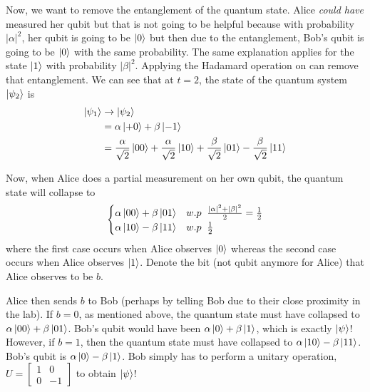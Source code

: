 Now, we want to remove the entanglement of the quantum state. Alice \textit{could have} measured her qubit but that is not going to be helpful because with probability \(|\alpha|^2\), her qubit is going to be \(\ket{0}\) but then due to the entanglement, Bob's qubit is going to be \(\ket{0}\) with the same probability. The same explanation applies for the state \(\ket{1}\) with probability \(|\beta|^2\). Applying the Hadamard operation on  can remove that entanglement. We can see that at \(t = 2\), the state of the quantum system \(\ket{\psi_2}\) is \begin{equation}
    \begin{aligned}
        \ket{\psi_1} &\rightarrow \ket{\psi_2}\\
        &= \alpha \ket{+0} + \beta \ket{-1}\\
        &= \frac{\alpha}{\sqrt{2}}\ket{00} + \frac{\alpha}{\sqrt{2}}
        \ket{10} + \frac{\beta}{\sqrt{2}}\ket{01} - \frac{\beta}{\sqrt{2}}
        \ket{11}
    \end{aligned}
\end{equation}

Now, when Alice does a partial measurement on her own qubit, the quantum state will collapse to \begin{equation}
    \begin{cases}
    \alpha \ket{00} + \beta \ket{01} &w.p \;\;\frac{|\alpha|^2 + |\beta|^2}{2} = \frac{1}{2}\\
    \alpha \ket{10} - \beta \ket{11} &w.p \;\; \frac{1}{2}
\end{cases}
\end{equation} where the first case occurs when Alice observes \(\ket{0}\) whereas the second case occurs when Alice observes \(\ket{1}\). Denote the bit (not qubit anymore for Alice) that Alice observes to be \(b\).

Alice then sends \(b\) to Bob (perhaps by telling Bob due to their close proximity in the lab). If \(b = 0\), as mentioned above, the quantum state must have collapsed to \(\alpha \ket{00} + \beta \ket{01}\). Bob's qubit would have been \(\alpha \ket{0} + \beta \ket{1}\), which is exactly \(\ket{\psi}\)! However, if \(b = 1\), then the quantum state must have collapsed to \(\alpha \ket{10} - \beta \ket{11}\). Bob's qubit is \(\alpha \ket 0 - \beta\ket{1}\). Bob simply has to perform a unitary operation, \(U = \begin{bmatrix}
    1 & 0\\ 0 & -1
\end{bmatrix}\) to obtain \(\ket{\psi}\)!

